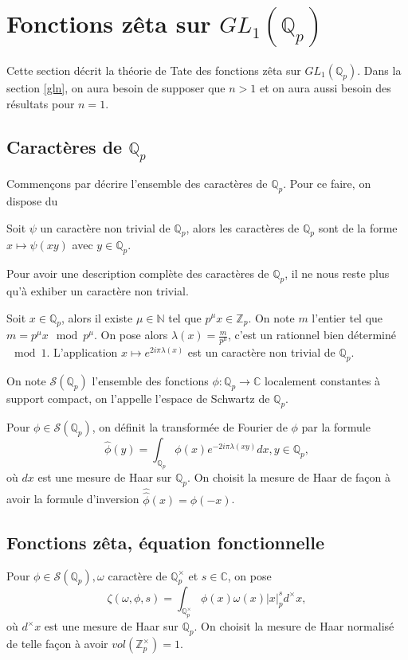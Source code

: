 \section{Fonctions zêta sur $GL_1(\mathbb{Q}_p)$}

Cette section décrit la théorie de Tate \cite{tate} des fonctions zêta sur $GL_1(\mathbb{Q}_p)$. Dans la section \ref{gln}, on aura besoin de supposer que $n > 1$ et on aura aussi besoin des résultats pour $n=1$.

\subsection{Caractères de $\mathbb{Q}_p$}

Commençons par décrire l'ensemble des caractères de $\mathbb{Q}_p$. Pour ce faire, on dispose du

\begin{lemme}
Soit $\psi$ un caractère non trivial de $\mathbb{Q}_p$, alors les caractères de $\mathbb{Q}_p$ sont de la forme $x \mapsto \psi(xy)$ avec $y \in \mathbb{Q}_p$.
\end{lemme}

Pour avoir une description complète des caractères de $\mathbb{Q}_p$, il ne nous reste plus qu'à exhiber un caractère non trivial.

Soit $x \in \mathbb{Q}_p$, alors il existe $\mu \in \mathbb{N}$ tel que $p^\mu x \in \mathbb{Z}_p$. On note $m$ l'entier tel que $m = p^\mu x \mod p^\mu$. On pose alors $\lambda(x) = \frac{m}{p^\mu}$, c'est un rationnel bien déterminé $\mod 1$. L'application $x \mapsto e^{2i\pi \lambda(x)}$ est un caractère non trivial de $\mathbb{Q}_p$.

On note $\mathcal{S}(\mathbb{Q}_p)$ l'ensemble des fonctions $\phi : \mathbb{Q}_p \rightarrow \mathbb{C}$ localement constantes à support compact, on l'appelle l'espace de Schwartz de $\mathbb{Q}_p$.

Pour $\phi \in \mathcal{S}(\mathbb{Q}_p)$, on définit la transformée de Fourier de $\phi$ par la formule
\begin{equation}
\hat{\phi}(y) = \int_{\mathbb{Q}_p} \phi(x) e^{-2i\pi \lambda(xy)}dx, y \in \mathbb{Q}_p,
\end{equation}
où $dx$ est une mesure de Haar sur $\mathbb{Q}_p$. On choisit la mesure de Haar de façon à avoir la formule d'inversion $\hat{\hat{\phi}}(x)=\phi(-x)$.

\subsection{Fonctions zêta, équation fonctionnelle}
\begin{definition}
Pour $\phi \in \mathcal{S}(\mathbb{Q}_p), \omega$ caractère de $\mathbb{Q}_p^\times$ et $s \in \mathbb{C}$, on pose
\begin{equation}
\zeta(\omega,\phi,s) = \int_{\mathbb{Q}_p^\times} \phi(x) \omega(x) |x|_p^s d^\times x,
\end{equation}
où $d^\times x$ est une mesure de Haar sur $\mathbb{Q}_p$. On choisit la mesure de Haar normalisé de telle façon à avoir $vol(\mathbb{Z}_p^\times)=1$.
\end{definition}

